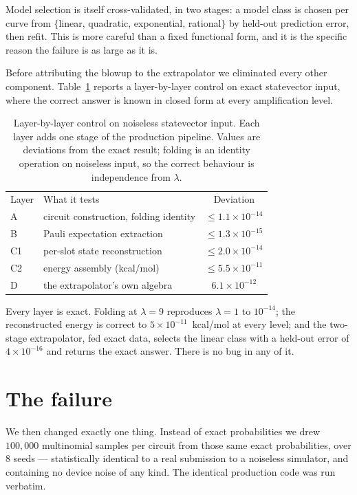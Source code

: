 \documentclass[aps,prx,twocolumn,superscriptaddress,nofootinbib,floatfix]{revtex4-2}
\begin{document}
Model selection is itself cross-validated, in two stages: a model class is
chosen per curve from $\{$linear, quadratic, exponential, rational$\}$ by
held-out prediction error, then refit. This is more careful than a fixed
functional form, and it is the specific reason the failure is as large as
it is.

Before attributing the blowup to the extrapolator we eliminated every
other component. Table~\ref{tab:control} reports a layer-by-layer control
on exact statevector input, where the correct answer is known in closed
form at every amplification level.

\begin{table}[t]
\caption{Layer-by-layer control on noiseless statevector input. Each layer
adds one stage of the production pipeline. Values are deviations from the
exact result; folding is an identity operation on noiseless input, so the
correct behaviour is independence from $\lambda$.}
\label{tab:control}
\begin{ruledtabular}
\begin{tabular}{llc}
Layer & What it tests & Deviation \\
\colrule
A & circuit construction, folding identity & $\le1.1\times10^{-14}$ \\
B & Pauli expectation extraction & $\le1.3\times10^{-15}$ \\
C1 & per-slot state reconstruction & $\le2.0\times10^{-14}$ \\
C2 & energy assembly (kcal/mol) & $\le5.5\times10^{-11}$ \\
D & the extrapolator's own algebra & $6.1\times10^{-12}$ \\
\end{tabular}
\end{ruledtabular}
\end{table}

Every layer is exact. Folding at $\lambda=9$ reproduces $\lambda=1$ to
$10^{-14}$; the reconstructed energy is correct to $5\times10^{-11}$~kcal/mol
at every level; and the two-stage extrapolator, fed exact data, selects
the linear class with a held-out error of $4\times10^{-16}$ and returns
the exact answer. There is no bug in any of it.

\section{The failure}

We then changed exactly one thing. Instead of exact probabilities we drew
$100{,}000$ multinomial samples per circuit from those same exact
probabilities, over $8$ seeds --- statistically identical to a real
submission to a noiseless simulator, and containing no device noise of any
kind. The identical production code was run verbatim.
\end{document}
